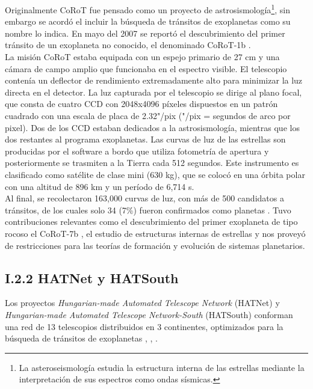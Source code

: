 Originalmente CoRoT fue pensado como un proyecto de astrosismología\footnote{La asteroseismología estudia la estructura interna de las estrellas mediante la interpretación de sus espectros como ondas sísmicas.}, sin embargo se acordó el incluir la búsqueda de tránsitos de exoplanetas como su nombre lo indica. En mayo del 2007 se reportó el descubrimiento del primer tránsito de un exoplaneta no conocido, el denominado CoRoT-1b \cite{barge2008transiting}. \\

La misión CoRoT estaba equipada con un espejo primario de 27 cm  y una cámara de campo amplio que funcionaba en el espectro visible. El telescopio contenía un deflector de rendimiento extremadamente alto para minimizar la luz directa en el detector. La luz capturada por el telescopio se dirige al plano focal, que consta de cuatro CCD con 2048x4096 píxeles dispuestos en un patrón cuadrado con una escala de placa de 2.32"/pix ("/pix = segundos de arco por pixel). Dos de los CCD estaban dedicados a la astrosismología, mientras que los dos restantes al programa exoplanetas. Las curvas de luz de las estrellas son producidas por el software a bordo que utiliza fotometría de apertura y posteriormente se trasmiten a la Tierra cada 512 segundos. Este instrumento es clasificado como satélite de clase mini (630 kg), que se colocó en una órbita polar con una altitud de 896 km y un período de 6,714 s.\\

Al final, se recolectaron 163,000 curvas de luz, con más de 500 candidatos a tránsitos, de los cuales solo 34 (7\%) fueron confirmados como planetas \cite{moutou2013corot}. Tuvo contribuciones relevantes como el descubrimiento del primer exoplaneta de tipo rocoso el CoRoT-7b \cite{leger2009transiting}, el estudio de estructuras internas de estrellas y nos proveyó de restricciones para las teorías de formación y evolución de sistemas planetarios.

\subsection*{I.2.2 HATNet y HATSouth}

Los proyectos \textit{Hungarian-made Automated Telescope Network} (HATNet) y \textit{Hungarian-made Automated Telescope Network-South} (HATSouth) conforman una red de 13 telescopios distribuidos en 3 continentes, optimizados para la búsqueda de tránsitos de exoplanetas \cite{bakos2002system}, \cite{bakos2004wide}, \cite{bakos2013hatsouth}. \\

